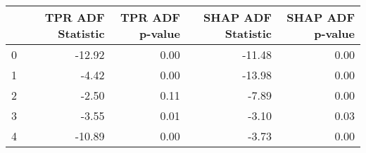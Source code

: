 \begin{tabular}{lrrrr}
\toprule
 & TPR ADF Statistic & TPR ADF p-value & SHAP ADF Statistic & SHAP ADF p-value \\
\midrule
0 & -12.92 & 0.00 & -11.48 & 0.00 \\
1 & -4.42 & 0.00 & -13.98 & 0.00 \\
2 & -2.50 & 0.11 & -7.89 & 0.00 \\
3 & -3.55 & 0.01 & -3.10 & 0.03 \\
4 & -10.89 & 0.00 & -3.73 & 0.00 \\
\bottomrule
\end{tabular}
